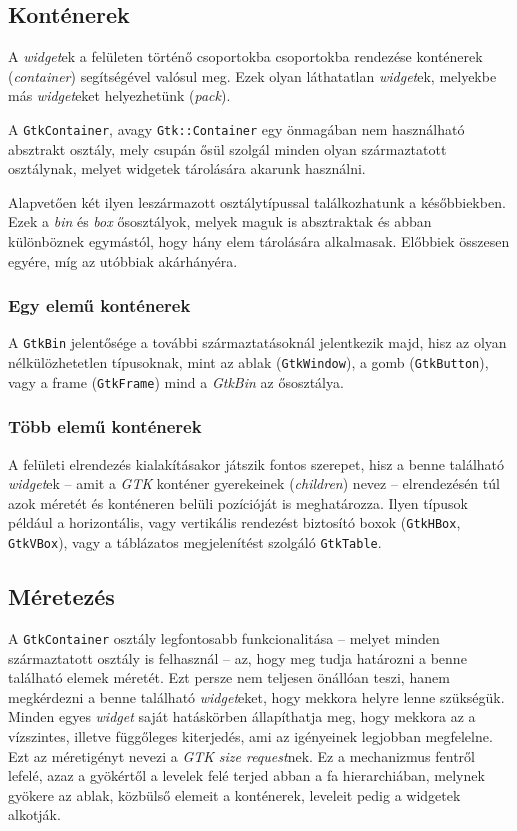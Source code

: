 \documentclass[a4paper,10pt]{article}
\begin{document}
\subsection{Konténerek}

A \textit{widget}ek a felületen történő csoportokba csoportokba rendezése konténerek (\textit{container}) segítségével valósul meg. Ezek olyan láthatatlan \textit{widget}ek, melyekbe más \textit{widget}eket helyezhetünk (\textit{pack}).

A \texttt{GtkContainer}, avagy \texttt{Gtk::Container} egy önmagában nem használható absztrakt osztály, mely csupán ősül szolgál minden olyan származtatott osztálynak, melyet widgetek tárolására akarunk használni.

Alapvetően két ilyen leszármazott osztálytípussal találkozhatunk a későbbiekben. Ezek a \textit{bin} és \textit{box} ősosztályok, melyek maguk is absztraktak és abban különböznek egymástól, hogy hány elem tárolására alkalmasak. Előbbiek összesen egyére, míg az utóbbiak akárhányéra.

\subsubsection{Egy elemű konténerek}

A \texttt{GtkBin} jelentősége a további származtatásoknál jelentkezik majd, hisz az olyan nélkülözhetetlen típusoknak, mint az ablak (\texttt{GtkWindow}), a gomb (\texttt{GtkButton}), vagy a frame (\texttt{GtkFrame}) mind a \textit{GtkBin} az ősosztálya.

\subsubsection{Több elemű konténerek}

A felületi elrendezés kialakításakor játszik fontos szerepet, hisz a benne található \textit{widget}ek -- amit a \textit{GTK} konténer gyerekeinek (\textit{children}) nevez -- elrendezésén túl azok méretét és konténeren belüli pozícióját is meghatározza. Ilyen típusok például a horizontális, vagy vertikális rendezést biztosító boxok (\texttt{GtkHBox}, \texttt{GtkVBox}), vagy a táblázatos megjelenítést szolgáló \texttt{GtkTable}.

\subsection{Méretezés}

A \texttt{GtkContainer} osztály legfontosabb funkcionalitása -- melyet minden származtatott osztály is felhasznál -- az, hogy meg tudja határozni a benne található elemek méretét. Ezt persze nem teljesen önállóan teszi, hanem megkérdezni a benne található \textit{widget}eket, hogy mekkora helyre lenne szükségük. Minden egyes \textit{widget} saját hatáskörben állapíthatja meg, hogy mekkora az a vízszintes, illetve függőleges kiterjedés, ami az igényeinek legjobban megfelelne. Ezt az méretigényt nevezi a \textit{GTK} \textit{size request}nek. Ez a mechanizmus fentről lefelé, azaz a gyökértől a levelek felé terjed abban a fa hierarchiában, melynek gyökere az ablak, közbülső elemeit a konténerek, leveleit pedig a widgetek alkotják.
\end{document}
